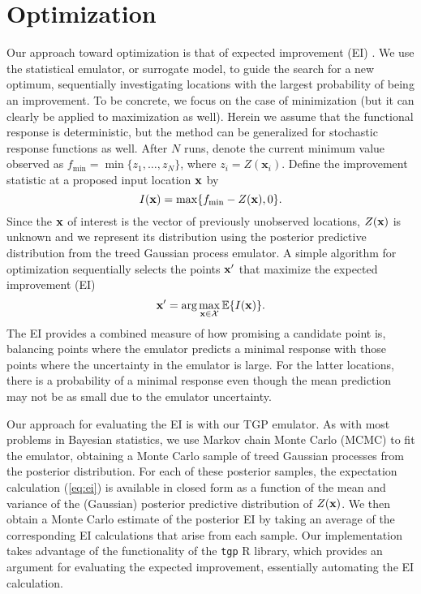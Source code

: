 \documentclass[12pt]{article}
\begin{document}
\section{Optimization} \label{sec:opt}

Our approach toward optimization is that of expected improvement (EI)
\cite{jones:schonlau:welch:1998,tadd:lee:gray:grif:2009}.  We
use the statistical emulator, or surrogate model, to guide the search
for a new optimum, sequentially investigating locations with the
largest probability of being an improvement.  To be concrete, we focus
on the case of minimization (but it can clearly be applied to
maximization as well).  Herein we assume that the functional response
is deterministic, but the method can be generalized for stochastic
response functions as well.  After $N$ runs, denote the current
minimum value observed as $f_{\min} = \min\{z_1,\ldots,z_N\}$, where
$z_i = Z(\mathbf{x}_i)$.  Define the improvement statistic at a
proposed input location ${\bf x}$ by
\begin{equation} 
I({\bf x}) = \max\{f_{\min} - Z({\bf x}), 0\}.
\end{equation}
Since the ${\bf x}$ of interest is the vector of previously unobserved locations,
$Z({\bf x})$ is unknown and we represent its distribution using
the posterior predictive distribution from the treed Gaussian process
emulator.  A simple algorithm for optimization sequentially
selects the points ${\bf x'}$ that maximize the expected improvement (EI)
\begin{equation}
{\bf x'} = \mbox{arg} \max_{{\bf x}\in \mathcal{X}} \mathbb{E}\{I({\bf x})\}.
\label{eq:ei}
\end{equation}
The EI provides a combined measure of how promising a candidate point
is, balancing points where the emulator predicts a minimal response
with those points where the uncertainty in the emulator is large. For
the latter locations, there is a probability of a minimal response
even though the mean prediction may not be as small due to the
emulator uncertainty.

Our approach for evaluating the EI is with our TGP emulator.  As with
most problems in Bayesian statistics, we use Markov chain Monte Carlo
(MCMC) \cite{gelm:carl:ster:rubi:1995} to fit the emulator, obtaining
a Monte Carlo sample of treed Gaussian processes from the posterior
distribution.  For each of these posterior samples, the expectation
calculation (\ref{eq:ei}) is available in closed form as a function of
the mean and variance of the (Gaussian) posterior predictive
distribution of $Z(\bf x)$.  We then obtain a Monte Carlo estimate of
the posterior EI by taking an average of the corresponding EI
calculations that arise from each sample.  Our implementation takes
advantage of the functionality of the {\tt tgp} {\sf R} library, which
provides an argument for evaluating the expected improvement,
essentially automating the EI calculation.
\end{document}
